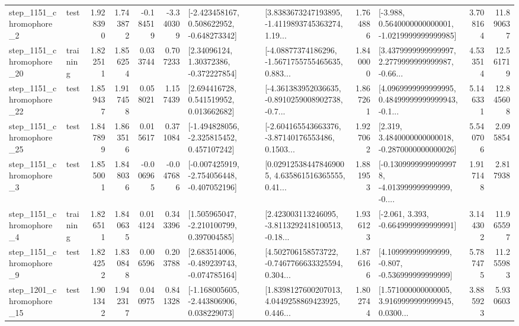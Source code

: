 \begin{tabular}{llrrrrllrlrr}
  step\_1151\_chromophore\_2 &      test &      1.928390 &    1.743872 &     -0.184519 & -3.340309 &   [-2.423458167, 0.508622952, -0.648273342] &  [3.8383673247193895, -1.4119893745363274, 1.19... &       1.764886 &  [-3.988, 0.5640000000000001, -1.0219999999999985] &            3.708164 &         11.890637 \\
 step\_1151\_chromophore\_20 &  training &      1.822511 &    1.856254 &      0.033744 &  0.707233 &      [2.34096124, 1.30372386, -0.372227854] &  [-4.08877374186296, -1.5671755755465635, 0.883... &       1.840000 &  [3.4379999999999997, 2.2779999999999987, -0.66... &            4.533514 &         12.561719 \\
 step\_1151\_chromophore\_22 &      test &      1.859437 &    1.917458 &      0.058021 &  1.157439 &     [2.694416728, 0.541519952, 0.013662682] &  [-4.361383952036635, -0.8910259008902738, -0.7... &       1.867261 &  [4.0969999999999995, 0.48499999999999943, -0.1... &            5.146331 &         12.845608 \\
 step\_1151\_chromophore\_25 &      test &      1.847899 &    1.863516 &      0.015617 &  0.371084 &   [-1.494828056, -2.325815452, 0.457107242] &  [-2.604165543663376, -3.87140176553486, 0.1503... &       1.927062 &   [2.319, 3.4840000000000018, -0.2870000000000026] &            5.540706 &          2.095854 \\
  step\_1151\_chromophore\_3 &      test &      1.855001 &    1.848036 &     -0.006965 & -0.047686 &  [-0.007425919, -2.754056448, -0.407052196] &  [0.029125384478469005, 4.635861516365555, 0.41... &       1.881953 &  [-0.13099999999999978, -4.013999999999999, -0.... &            1.917148 &          2.817938 \\
  step\_1151\_chromophore\_4 &  training &      1.826511 &    1.840635 &      0.014124 &  0.343396 &    [1.505965047, -2.210100799, 0.397004585] &  [2.423003113246095, -3.8113292418100513, -0.18... &       1.936123 &               [-2.061, 3.393, -0.6649999999999991] &            3.144302 &         11.965597 \\
  step\_1151\_chromophore\_9 &      test &      1.824252 &    1.830848 &      0.006596 &  0.203788 &   [2.683514006, -0.489239743, -0.074785164] &  [4.502706158573722, -0.7467766633325594, 0.304... &       1.876166 &    [4.109999999999999, -0.807, -0.536999999999999] &            5.787475 &         11.255983 \\
 step\_1201\_chromophore\_15 &      test &      1.901342 &    1.942317 &      0.040975 &  0.841328 &   [-1.168005605, -2.443806906, 0.038229073] &  [1.8398127600207013, 4.0449258869423925, 0.446... &       1.802744 &  [1.571000000000005, 3.9169999999999945, 0.0300... &            3.885923 &          5.930603 \\

\end{tabular}

